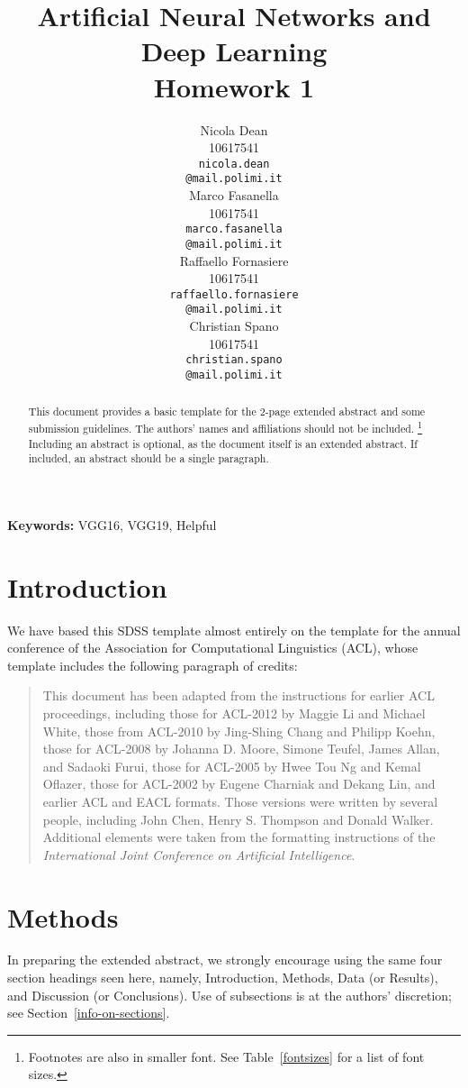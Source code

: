 \documentclass[10pt]{article}
\title{Artificial Neural Networks and Deep Learning \\
Homework 1}
\author{
  Nicola Dean \\
  10617541 \\
  {\tt nicola.dean \\
  \tt @mail.polimi.it} \\\And
  Marco Fasanella \\
  10617541 \\
  {\tt marco.fasanella   \\
  \tt @mail.polimi.it}   \\\And
  Raffaello Fornasiere \\
    10617541 \\
    {\tt raffaello.fornasiere   \\
    \tt @mail.polimi.it}   \\\And
  Christian Spano \\
  10617541 \\
  {\tt christian.spano \\
  \tt @mail.polimi.it} \\}
\date{}
\begin{document}
\maketitle
\begin{abstract}
This document provides a basic template for the 2-page extended abstract
and some submission guidelines. The authors' names and affiliations should not be included. \footnote{Footnotes are also in smaller font.
See Table~\ref{fontsizes} for a list of font sizes.}
Including an abstract is optional, as the document itself is an extended abstract.
If included, an abstract should be a single paragraph.
\end{abstract}

{\bf Keywords:} VGG16, VGG19, Helpful

\section{Introduction}

We have based this SDSS template almost entirely on the template for
the annual conference of the Association for Computational Linguistics (ACL), whose
template includes the following paragraph of credits:
\begin{quotation}
\small %
This document has been adapted from the instructions for earlier ACL
proceedings, including those for ACL-2012 by Maggie Li and Michael
White, those from ACL-2010 by Jing-Shing Chang and Philipp Koehn,
those for ACL-2008 by Johanna D. Moore, Simone Teufel, James Allan,
and Sadaoki Furui, those for ACL-2005 by Hwee Tou Ng and Kemal
Oflazer, those for ACL-2002 by Eugene Charniak and Dekang Lin, and
earlier ACL and EACL formats. Those versions were written by several
people, including John Chen, Henry S. Thompson and Donald
Walker. Additional elements were taken from the formatting
instructions of the {\em International Joint Conference on Artificial
  Intelligence}.
\end{quotation}

\section{Methods}

In preparing the extended abstract,
we strongly encourage using the same four section headings seen here, namely,
Introduction, Methods, Data (or Results), and Discussion (or Conclusions).
Use of subsections is at the authors' discretion; see Section~\ref{info-on-sections}.
\end{document}
